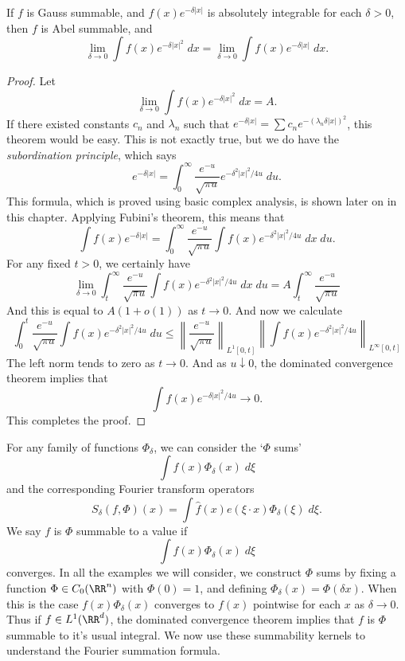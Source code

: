 \begin{lemma}
	If $f$ is Gauss summable, and $f(x) e^{-\delta |x|}$ is absolutely integrable for each $\delta > 0$, then $f$ is Abel summable, and
	\[ \lim_{\delta \to 0} \int f(x) e^{-\delta |x|^2}\; dx = \lim_{\delta \to 0} \int f(x) e^{-\delta |x|}\; dx. \]
\end{lemma}
\begin{proof}
	Let
	\[ \lim_{\delta \to 0} \int f(x) e^{-\delta |x|^2}\; dx = A. \]
	If there existed constants $c_n$ and $\lambda_n$ such that $e^{-\delta |x|} = \sum c_n e^{-(\lambda_n \delta |x|)^2}$, this theorem would be easy. This is not exactly true, but we do have the {\it subordination principle}, which says
	\[ e^{-\delta |x|} = \int_0^\infty \frac{e^{-u}}{\sqrt{\pi u}} e^{-\delta^2 |x|^2/4u}\; du. \]
	This formula, which is proved using basic complex analysis, is shown later on in this chapter. Applying Fubini's theorem, this means that
	\[ \int f(x) e^{-\delta |x|} = \int_0^\infty \frac{e^{-u}}{\sqrt{\pi u}} \int f(x) e^{-\delta^2 |x|^2/4u}\; dx\; du. \]
	For any fixed $t > 0$, we certainly have
	\[ \lim_{\delta \to 0} \int_t^\infty \frac{e^{-u}}{\sqrt{\pi u}} \int f(x) e^{-\delta^2 |x|^2/4u}\; dx\; du = A \int_t^\infty \frac{e^{-u}}{\sqrt{\pi u}} \]
	And this is equal to $A(1 + o(1))$ as $t \to 0$. And now we calculate
	\[ \int_0^t \frac{e^{-u}}{\sqrt{\pi u}} \int f(x) e^{-\delta^2 |x|^2/4u}\; du \leq \left\| \frac{e^{-u}}{\sqrt{\pi u}} \right\|_{L^1[0,t]} \left\| \int f(x) e^{-\delta^2 |x|^2/4u} \right\|_{L^\infty[0,t]} \]
	The left norm tends to zero as $t \to 0$. And as $u \downarrow 0$, the dominated convergence theorem implies that
	\[ \int f(x) e^{-\delta |x|^2/4u} \to 0. \]
	This completes the proof.
\end{proof}

For any family of functions $\Phi_\delta$, we can consider the `$\Phi$ sums'
%
\[ \int f(x) \Phi_\delta(x)\; d\xi \]
%
and the corresponding Fourier transform operators
%
\[ S_\delta(f,\Phi)(x) = \int \widehat{f}(x) e(\xi \cdot x) \Phi_\delta(\xi)\; d\xi. \]
%
We say $f$ is $\Phi$ summable to a value if
%
\[ \int f(x) \Phi_\delta(x)\; d\xi \]
%
converges. In all the examples we will consider, we construct $\Phi$ sums by fixing a function $\Phi \in C_0(\RR^n)$ with $\Phi(0) = 1$, and defining $\Phi_\delta(x) = \Phi(\delta x)$. When this is the case $f(x) \Phi_\delta(x)$ converges to $f(x)$ pointwise for each $x$ as $\delta \to 0$. Thus if $f \in L^1(\RR^d)$, the dominated convergence theorem implies that $f$ is $\Phi$ summable to it's usual integral. We now use these summability kernels to understand the Fourier summation formula.

